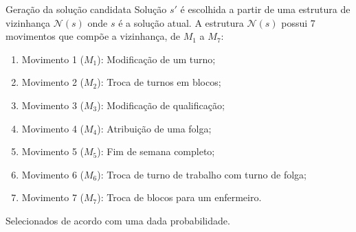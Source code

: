 \documentclass[8pt,mathserif,professionalfont]{beamer}
\begin{document}
\begin{frame}{Geração da solução candidata}
	Solução $s'$ é escolhida a partir de uma estrutura de vizinhança $\mathcal{N}(s)$ onde $s$ é a solução atual.
	A estrutura $\mathcal{N}(s)$ possui 7 movimentos que compõe a vizinhança, de $M_1$ a $M_7$:
	\medskip
	\begin{enumerate}
		\item Movimento 1 ($M_1$): Modificação de um turno;
		\item Movimento 2 ($M_2$): Troca de turnos em blocos;
		\item Movimento 3 ($M_3$): Modificação de qualificação;
		\item Movimento 4 ($M_4$): Atribuição de uma folga;
		\item Movimento 5 ($M_5$): Fim de semana completo;
		\item Movimento 6 ($M_6$): Troca de turno de trabalho com turno de folga;
		\item Movimento 7 ($M_7$): Troca de blocos para um enfermeiro.
	\end{enumerate}

	\medskip
	
	 Selecionados de acordo com uma dada probabilidade.
	

\end{frame}
\end{document}
